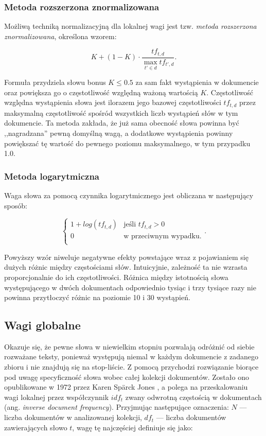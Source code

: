 \documentclass{pracamgr}
\begin{document}
\subsubsection*{Metoda rozszerzona znormalizowana}

Możliwą techniką normalizacyjną dla lokalnej wagi jest tzw. \textit{metoda rozszerzona znormalizowana}, określona wzorem:

\[
K + (1 - K) \cdot \frac{tf_{t,d}}{\max_{t' \in d} tf_{t',d}}.
\]

Formuła przydziela słowu bonus $K \leq 0.5$ za sam fakt wystąpienia w dokumencie oraz powiększa go o częstotliwość względną ważoną wartością $K$. Częstotliwość względna wystąpienia słowa jest ilorazem jego bazowej częstotliwości $tf_{t,d}$ przez maksymalną częstotliwość spośród wszystkich liczb wystąpień słów w tym dokumencie. Ta metoda zakłada, że już sama obecność słowa powinna być ,,nagradzana'' pewną domyślną wagą, a dodatkowe wystąpienia powinny powiększać tę wartość do pewnego poziomu maksymalnego, w tym przypadku 1.0.

\subsubsection*{Metoda logarytmiczna}
Waga słowa za pomocą czynnika logarytmicznego jest obliczana w następujący sposób:

\[
\begin{cases} 
    1 + log(tf_{t,d}) & \text{jeśli } tf_{t,d} > 0 \\ 
    0 & \text{w przeciwnym wypadku.} \\ 
\end{cases}.
\]

Powyższy wzór niweluje negatywne efekty powstające wraz z pojawianiem się dużych różnic między częstościami słów. Intuicyjnie, zależność ta nie wzrasta proporcjonalnie do ich częstotliwości. Różnica między istotnością słowa występującego w dwóch dokumentach odpowiednio tysiąc i trzy tysiące razy nie powinna przytłoczyć różnic na poziomie 10 i 30 wystąpień.

\subsection{Wagi globalne}

Okazuje się, że pewne słowa w niewielkim stopniu pozwalają odróżnić od siebie rozważane teksty, ponieważ występują niemal w każdym dokumencie z zadanego zbioru i nie znajdują się na stop-liście. Z pomocą przychodzi rozwiązanie biorące pod uwagę specyficzność słowa wobec całej kolekcji dokumentów. Zostało ono opublikowane w 1972 przez Karen Spärck Jones \cite{sparck}, a polega na przeskalowaniu wagi lokalnej przez współczynnik $idf_t$ zwany odwrotną częstością w dokumentach (ang. \textit{inverse document frequency}). Przyjmując następujące oznaczenia: $N$ --- liczba dokumentów w analizowanej kolekcji, $ df_t $ --- liczba dokumentów zawierających słowo $t$, wagę tę najczęściej definiuje się jako: 
\end{document}
